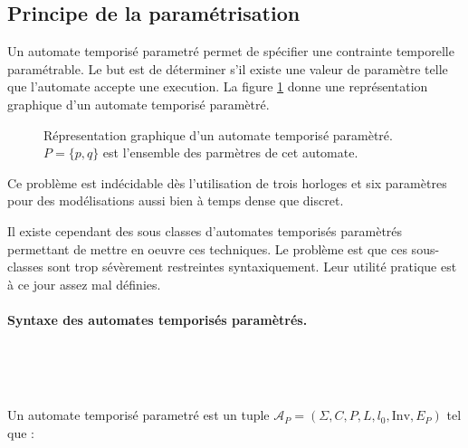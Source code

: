     \subsection{Principe de la paramétrisation}
    
      Un automate temporisé parametré permet de spécifier une contrainte
      temporelle paramétrable. Le but est de déterminer s'il existe une valeur
      de paramètre telle que l'automate accepte une execution. La figure
      \ref{fig:automate-tempo-param} donne une représentation graphique d'un
      automate temporisé paramètré.

      \begin{figure}[!ht]
        \centering \small
        \caption{Répresentation graphique d'un automate temporisé paramètré. \\
          $P = \{ p, q \}$ est l'ensemble des parmètres de cet automate.}
        \label{fig:automate-tempo-param}
      \end{figure}

      Ce problème est indécidable dès l'utilisation de trois horloges et
      six paramètres pour des modélisations aussi bien à temps dense que
      discret.

      Il existe cependant des sous classes d'automates temporisés paramètrés
      permettant de mettre en oeuvre ces techniques. Le problème est que ces
      sous-classes sont trop sévèrement restreintes syntaxiquement. Leur
      utilité pratique est à ce jour assez mal définies.

      \paragraph{Syntaxe des automates temporisés paramètrés.} ~

        ~
      
        \noindent
        Un automate temporisé parametré est un tuple $\mathcal{A}_P =
        (\Sigma,C,P,L,l_0,\mathrm{Inv},E_P)$ tel que :
    
